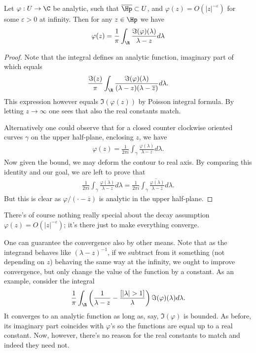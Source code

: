 \begin{lause}
	Let $\varphi : U \to \C$ be analytic, such that $\overline{\Hp} \subset U$, and $\varphi(z) = O(|z|^{-\varepsilon})$ for some $\varepsilon > 0$ at infinity. Then for any $z \in \Hp$ we have
	\begin{align*}
		\varphi(z) = \frac{1}{\pi}\int_{\R} \frac{\Im(\varphi)(\lambda)}{\lambda - z} d \lambda
	\end{align*}
\end{lause}
\begin{proof}
	Note that the integral defines an analytic function, imaginary part of which equals
	\begin{align*}
		\frac{\Im(z)}{\pi}\int_{\R} \frac{\Im(\varphi)(\lambda)}{(\lambda - z)(\lambda - \overline{z})} d \lambda.
	\end{align*}
	This expression however equals $\Im(\varphi(z))$ by Poisson integral formula. By letting $z \to \infty$ one sees that also the real constants match.

	Alternatively one could observe that for a closed counter clockwise oriented curves $\gamma$ on the upper half-plane, enclosing $z$, we have
	\begin{align*}
		\varphi(z) = \frac{1}{2\pi i}\int_{\gamma} \frac{\varphi(\lambda)}{\lambda - z} d \lambda.
	\end{align*}
	Now given the bound, we may deform the contour to real axis. By comparing this identity and our goal, we are left to prove that
	\begin{align*}
		\frac{1}{2\pi i}\int_{\gamma} \frac{\overline{\varphi(\lambda)}}{\lambda - z} d \lambda = \frac{1}{2\pi i} \overline{\int_{\gamma} \frac{\varphi(\lambda)}{\lambda - \overline{z}} d \lambda}.
	\end{align*}
	But this is clear as $\varphi/(\cdot - \overline{z})$ is analytic in the upper half-plane.
\end{proof}

There's of course nothing really special about the decay assumption $\varphi(z) = O(|z|^{-\varepsilon})$; it's there just to make everything converge.

One can guarantee the convergence also by other means. Note that as the integrand behaves like $(\lambda - z)^{-1}$, if we subtract from it something (not depending on $z$) behaving the same way at the infinity, we ought to improve convergence, but only change the value of the function by a constant. As an example, consider the integral
\begin{align}\label{easy_pick_repr}
	\frac{1}{\pi}\int_{\R} \left(\frac{1}{\lambda - z} - \frac{[|\lambda| > 1]}{\lambda} \right) \Im(\varphi)(\lambda)d \lambda.
\end{align}
It converges to an analytic function as long as, say, $\Im(\varphi)$ is bounded. As before, its imaginary part coincides with $\varphi$'s so the functions are equal up to a real constant. Now, however, there's no reason for the real constants to match and indeed they need not.

